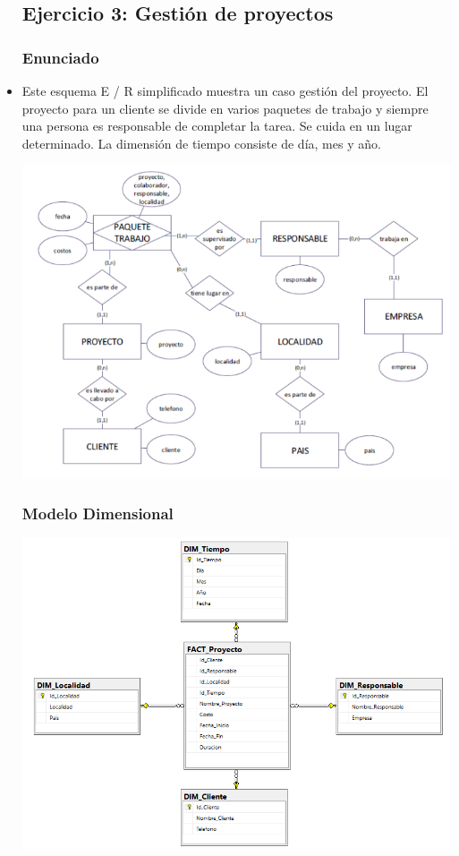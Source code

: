 \begin{itemize}
\subsection{Ejercicio 3: Gestión de proyectos}

\subsubsection{Enunciado}

		\item Este esquema E / R simplificado muestra un caso gestión del proyecto. El proyecto para un cliente se divide en varios paquetes de trabajo y siempre una persona es responsable de completar la tarea. Se cuida en un lugar determinado.
La dimensión de tiempo consiste de día, mes y año.

	\begin{center}
	\includegraphics[width=14cm]{./Imagenes/ejercicio3}
	\end{center}

     \subsubsection{Modelo Dimensional }
	\begin{center}
	\includegraphics[width=14cm]{./Imagenes/ejercicio3_dimensional}
	\end{center}

\end{itemize}
